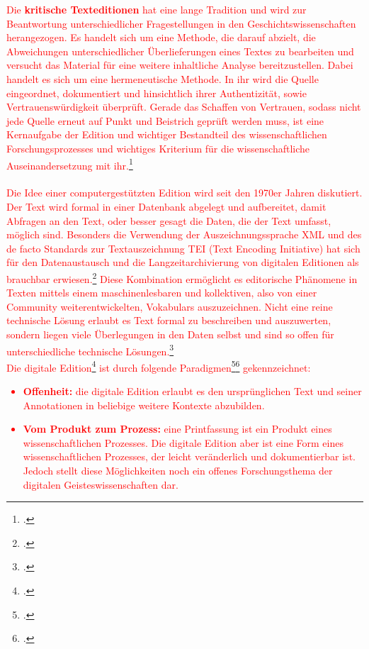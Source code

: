 \documentclass[12pt,a4paper]{article}
\begin{document}
\textcolor{red}{
Die \textbf{kritische Texteditionen} hat eine lange Tradition und wird zur Beantwortung unterschiedlicher Fragestellungen in den Geschichtswissenschaften herangezogen. Es handelt sich um eine Methode, die darauf abzielt, die Abweichungen unterschiedlicher Überlieferungen eines Textes zu bearbeiten und versucht das Material für eine weitere inhaltliche Analyse bereitzustellen. Dabei handelt es sich um eine hermeneutische Methode. In ihr wird die Quelle eingeordnet, dokumentiert und hinsichtlich ihrer Authentizität, sowie Vertrauenswürdigkeit überprüft. Gerade das Schaffen von Vertrauen, sodass nicht jede Quelle erneut auf Punkt und Beistrich geprüft werden muss, ist eine Kernaufgabe der Edition und wichtiger Bestandteil des wissenschaftlichen Forschungsprozesses und wichtiges Kriterium für die wissenschaftliche Auseinandersetzung mit ihr.\footcite[][S.101-144]{aumann1999digital}
\\
\\
Die Idee einer computergestützten Edition wird seit den 1970er Jahren diskutiert. Der Text wird formal in einer Datenbank abgelegt und aufbereitet, damit Abfragen an den Text, oder besser gesagt die Daten, die der Text umfasst, möglich sind. Besonders die Verwendung der Auszeichnungssprache XML und des de facto Standards zur Textauszeichnung TEI (Text Encoding Initiative) hat sich für den Datenaustausch und die Langzeitarchivierung von digitalen Editionen als brauchbar erwiesen.\footcite{burnard2014text} Diese Kombination ermöglicht es editorische Phänomene in Texten mittels einem maschinenlesbaren und kollektiven, also von einer Community weiterentwickelten, Vokabulars auszuzeichnen. Nicht eine reine technische Lösung erlaubt es Text formal zu beschreiben und auszuwerten, sondern liegen viele Überlegungen in den Daten selbst und sind so offen für unterschiedliche technische Lösungen.\footcite[][S.180-181]{vogeler2018religion}
\\
Die digitale Edition\footcite[Zu diesem Thema siehe auch:][]{pierazzo2016digital} ist durch folgende Paradigmen\footcite[][S.240-241]{sahle2017dhedition}\footcite[][S.102-108]{ScholgerMartina2018AadS} gekennzeichnet:
\begin{itemize}
\item \textbf{Offenheit:} die digitale Edition erlaubt es den ursprünglichen Text und seiner Annotationen in beliebige weitere Kontexte abzubilden. 
\item \textbf{Vom Produkt zum Prozess:} eine Printfassung ist ein Produkt eines wissenschaftlichen Prozesses. Die digitale Edition aber ist eine Form eines wissenschaftlichen Prozesses, der leicht veränderlich und dokumentierbar ist. Jedoch stellt diese Möglichkeiten noch ein offenes Forschungsthema der digitalen Geisteswissenschaften dar.

\end{itemize}}
\end{document}
